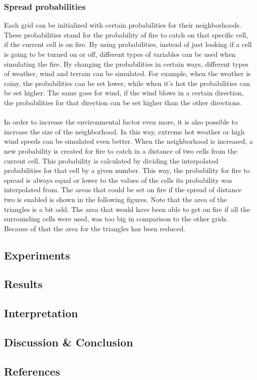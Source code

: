 \documentclass{article}
\begin{document}
\begin{multicols}{2}
\subsubsection*{Spread probabilities}
Each grid can be initialized with certain probabilities for their neighborhoods. These probabilities stand for the probability of fire to catch on that specific cell, if the current cell is on fire. By using probabilities, instead of just looking if a cell is going to be turned on or off, different types of variables can be used when simulating the fire. By changing the probabilities in certain ways, different types of weather, wind and terrain can be simulated. For example, when the weather is rainy, the probabilities can be set lower, while when it’s hot the probabilities can be set higher. The same goes for wind, if the wind blows in a certain direction, the probabilities for that direction can be set higher than the other directions.\\\\
In order to increase the environmental factor even more, it is also possible to increase the size of the neighborhood. In this way, extreme hot weather or high wind speeds can be simulated even better. When the neighborhood is increased, a new probability is created for fire to catch in a distance of two cells from the current cell. This probability is calculated by dividing the interpolated probabilities for that cell by a given number. This way, the probability for fire to spread is always equal or lower to the values of the cells its probability was interpolated from.
The areas that could be set on fire if the spread of distance two is enabled is shown in the following figures. Note that the area of the triangles is a bit odd. The area that would have been able to get on fire if all the surrounding cells were used, was too big in comparison to the other grids. Because of that the area for the triangles has been reduced.

\subsection*{Experiments}
\subsection*{Results}
\subsection*{Interpretation}

\subsection*{Discussion \& Conclusion}

\subsection*{References}
\end{multicols}
\newpage


\end{document}

